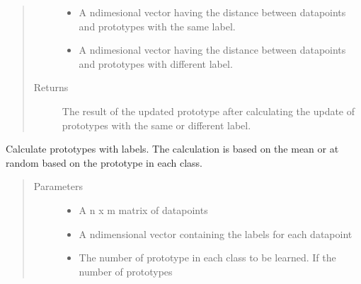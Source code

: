 \documentclass[letterpaper,10pt,english]{sphinxmanual}
\begin{document}
\begin{fulllineitems}
\begin{fulllineitems}
\begin{quote}
\begin{description}
\begin{itemize}
\item {} 
\sphinxAtStartPar
{} \textendash{} A n\sphinxhyphen{}dimesional vector having the distance between datapoints and prototypes with the same label.

\item {} 
\sphinxAtStartPar
{} \textendash{} A n\sphinxhyphen{}dimesional vector having the distance between datapoints and prototypes with different label.

\end{itemize}

\item[{Returns}] \leavevmode
\sphinxAtStartPar
The result of the updated prototype after calculating the update of prototypes with the same or different label.

\end{description}\end{quote}

\end{fulllineitems}


\begin{fulllineitems}
\label{\detokenize{Renyi_final:Renyi_final.GLVQ.create_data_prototype}}
\sphinxAtStartPar
Calculate prototypes with labels. The calculation is based on the mean or at random based on the
prototype in each class.
\begin{quote}\begin{description}
\item[{Parameters}] \leavevmode\begin{itemize}
\item {} 
\sphinxAtStartPar
{} \textendash{} A n x m matrix of datapoints

\item {} 
\sphinxAtStartPar
{} \textendash{} A n\sphinxhyphen{}dimensional vector containing the labels for each datapoint

\item {} 
\sphinxAtStartPar
{} \textendash{} The number of prototype in each class to be learned. If the number of prototypes


\end{itemize}
\end{description}
\end{quote}
\end{fulllineitems}
\end{fulllineitems}
\end{document}
